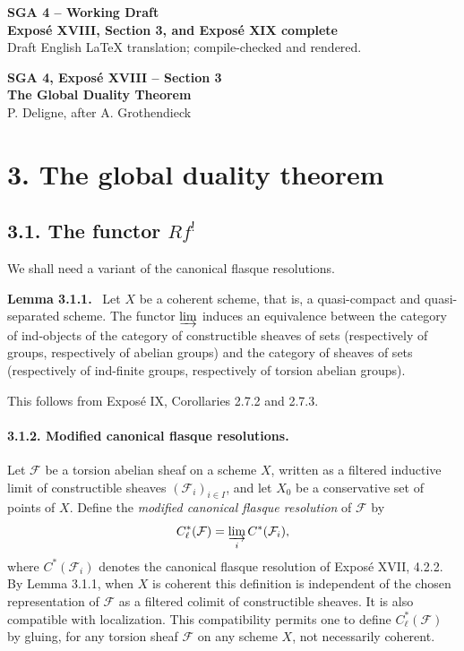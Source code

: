 \documentclass[12pt]{article}
\newcommand{\Ff}{\mathcal F}
\newenvironment{statement}[1]{\par\medskip\noindent\textbf{#1.}\ }{\par\medskip}
\begin{document}
\begin{center}
{\Large \textbf{SGA 4 -- Working Draft}}\\[0.4em]
{\large \textbf{Expos\'e XVIII, Section 3, and Expos\'e XIX complete}}\\[0.25em]
{\normalsize Draft English LaTeX translation; compile-checked and rendered.}
\end{center}

\bigskip

\begin{center}
{\Large \textbf{SGA 4, Expos\'e XVIII -- Section 3}}\\[0.35em]
{\large \textbf{The Global Duality Theorem}}\\[0.25em]
{\normalsize P. Deligne, after A. Grothendieck}
\end{center}

\section*{3. The global duality theorem}

\subsection*{3.1. The functor \texorpdfstring{$Rf^!$}{Rf!}}

We shall need a variant of the canonical flasque resolutions.

\begin{statement}{Lemma 3.1.1}
Let $X$ be a coherent scheme, that is, a quasi-compact and quasi-separated scheme. The functor $\varinjlim$ induces an equivalence between the category of ind-objects of the category of constructible sheaves of sets (respectively of groups, respectively of abelian groups) and the category of sheaves of sets (respectively of ind-finite groups, respectively of torsion abelian groups).
\end{statement}

This follows from Expos\'e IX, Corollaries 2.7.2 and 2.7.3.

\paragraph{3.1.2. Modified canonical flasque resolutions.}
Let $\Ff$ be a torsion abelian sheaf on a scheme $X$, written as a filtered inductive limit of constructible sheaves $(\Ff_i)_{i\in I}$, and let $X_0$ be a conservative set of points of $X$. Define the \emph{modified canonical flasque resolution} of $\Ff$ by
\[
   C_\ell^*(\Ff)=\varinjlim_i C^*(\Ff_i),
\]
where $C^*(\Ff_i)$ denotes the canonical flasque resolution of Expos\'e XVII, 4.2.2. By Lemma 3.1.1, when $X$ is coherent this definition is independent of the chosen representation of $\Ff$ as a filtered colimit of constructible sheaves. It is also compatible with localization. This compatibility permits one to define $C_\ell^*(\Ff)$ by gluing, for any torsion sheaf $\Ff$ on any scheme $X$, not necessarily coherent.
\end{document}
